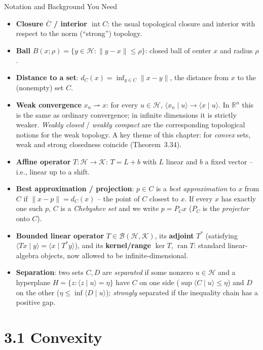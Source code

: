 \documentclass[aspectratio=169,10pt]{beamer}
\newcommand{\Hil}{\mathcal{H}}
\newcommand{\Kil}{\mathcal{K}}
\newcommand{\R}{\mathbb{R}}
\newcommand{\ran}{\operatorname{ran}}
\newcommand{\ip}[2]{\langle #1 \mid #2 \rangle}
\newcommand{\norm}[1]{\lVert #1 \rVert}
\newcommand{\dC}{d_C}
\newcommand{\PC}{P_C}
\begin{document}
\begin{frame}[allowframebreaks]{Notation and Background You Need}
\begin{itemize}
  \item \textbf{Closure $\overline C$ / interior $\operatorname{int}C$}:
    the usual topological closure and interior with respect to the norm
    (``strong'') topology.
  \item \textbf{Ball} $B(x;\rho) = \{y\in\Hil : \norm{y-x}\le \rho\}$: closed
    ball of center $x$ and radius $\rho$.
  \item \textbf{Distance to a set}: $\dC(x) = \inf_{y\in C}\norm{x-y}$, the
    distance from $x$ to the (nonempty) set $C$.
  \item \textbf{Weak convergence} $x_n \rightharpoonup x$: for every
    $u \in \Hil$, $\ip{x_n}{u}\to \ip{x}{u}$. In $\R^n$ this is the same as
    ordinary convergence; in infinite dimensions it is strictly weaker.
    \emph{Weakly closed} / \emph{weakly compact} are the corresponding
    topological notions for the weak topology. A key theme of this chapter:
    for \emph{convex} sets, weak and strong closedness coincide (Theorem~3.34).
  \item \textbf{Affine operator} $T\colon\Hil\to\Kil$: $T = L + b$ with $L$
    linear and $b$ a fixed vector -- i.e., linear up to a shift.

\framebreak

  \item \textbf{Best approximation / projection}: $p\in C$ is a
    \emph{best approximation} to $x$ from $C$ if $\norm{x-p}=\dC(x)$ -- the
    point of $C$ closest to $x$. If every $x$ has exactly one such $p$, $C$
    is a \emph{Chebyshev set} and we write $p = \PC x$ ($\PC$ is the
    \emph{projector} onto $C$).
  \item \textbf{Bounded linear operator} $T\in\mathcal B(\Hil,\Kil)$, its
    \textbf{adjoint} $T^*$ (satisfying $\ip{Tx}{y}=\ip{x}{T^*y}$), and its
    \textbf{kernel/range} $\ker T$, $\ran T$: standard linear-algebra objects,
    now allowed to be infinite-dimensional.
  \item \textbf{Separation}: two sets $C,D$ are \emph{separated} if some
    nonzero $u\in\Hil$ and a hyperplane $H=\{z:\ip{z}{u}=\eta\}$ have $C$ on
    one side ($\sup\ip{C}{u}\le\eta$) and $D$ on the other
    ($\eta\le\inf\ip{D}{u}$); \emph{strongly} separated if the inequality
    chain has a positive gap.
\end{itemize}

\end{frame}

\section{3.1 Convexity}
\end{document}

